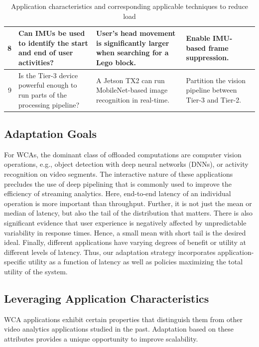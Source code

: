\begin{table}[]
\begin{tabular}{|r|p{22ex}|p{30ex}|p{25ex}|}
    8&Can IMUs be used to identify the start and end of user activities?
        & User's head movement is significantly larger when searching for a Lego block.
        & Enable IMU-based frame suppression. \\ \hline
    9&Is the Tier-3 device powerful enough to run parts of the processing pipeline?
        & A Jetson TX2 can run MobileNet-based image recognition in real-time.
        & Partition the vision pipeline between Tier-3 and Tier-2.   \\ \hline
    \end{tabular}
\vspace{0.1in}
    \caption{\small Application characteristics and corresponding applicable techniques to reduce load}
    \label{tab:questions-techniques}
\end{table}

\subsection{Adaptation Goals}
 
For WCAs, the dominant class of offloaded computations are computer vision
operations, e.g., object detection with deep neural networks (DNNs), or activity
recognition on video segments. The interactive nature of these applications
precludes the use of deep pipelining that is commonly used to improve the
efficiency of streaming analytics.  Here, end-to-end latency of an individual
operation is more important than throughput. Further, it is not just the mean or
median of latency, but also the tail of the distribution that matters.  There is
also significant evidence that user experience is negatively affected by
unpredictable variability in response times. Hence, a small mean with short tail
is the desired ideal. Finally, different applications have varying degrees of
benefit or utility at different levels of latency.  Thus, our adaptation
strategy incorporates application-specific utility as a function of latency as
well as policies maximizing the total utility of the system.


\subsection{Leveraging Application Characteristics}
\label{sec:workload-reduction}

WCA applications exhibit certain properties that distinguish them from
other video analytics applications studied in the past.  Adaptation
based on these attributes provides a unique opportunity to improve
scalability.

